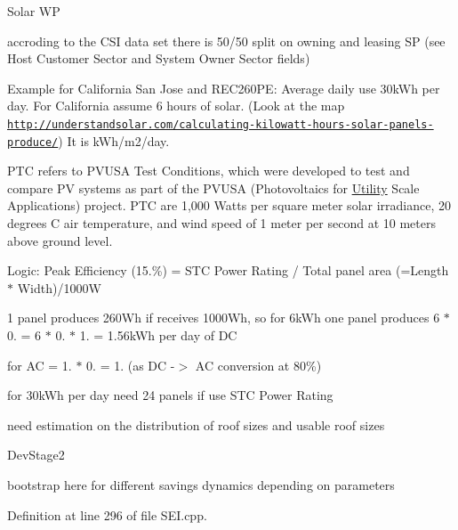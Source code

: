 \begin{DoxyRefDesc}{Solar W\+P}
\item[\hyperlink{wp__wp000003}{Solar W\+P}]accroding to the C\+S\+I data set there is 50/50 split on owning and leasing S\+P (see Host Customer Sector and System Owner Sector fields)\end{DoxyRefDesc}


Example for California San Jose and R\+E\+C260\+P\+E\+: Average daily use 30k\+Wh per day. For California assume 6 hours of solar. (Look at the map \href{http://understandsolar.com/calculating-kilowatt-hours-solar-panels-produce/}{\tt http\+://understandsolar.\+com/calculating-\/kilowatt-\/hours-\/solar-\/panels-\/produce/}) It is k\+Wh/m2/day.

P\+T\+C refers to P\+V\+U\+S\+A Test Conditions, which were developed to test and compare P\+V systems as part of the P\+V\+U\+S\+A (Photovoltaics for \hyperlink{classsolar__core_1_1_utility}{Utility} Scale Applications) project. P\+T\+C are 1,000 Watts per square meter solar irradiance, 20 degrees C air temperature, and wind speed of 1 meter per second at 10 meters above ground level.

Logic\+: Peak Efficiency (15.\%) = S\+T\+C Power Rating / Total panel area (=Length $\ast$ Width)/1000\+W

1 panel produces 260\+Wh if receives 1000\+Wh, so for 6k\+Wh one panel produces 6 $\ast$ 0. = 6 $\ast$ 0. $\ast$ 1. = 1.\+56k\+Wh per day of D\+C

for A\+C = 1. $\ast$ 0. = 1. (as D\+C -\/$>$ A\+C conversion at 80\%)

for 30k\+Wh per day need 24 panels if use S\+T\+C Power Rating

need estimation on the distribution of roof sizes and usable roof sizes \begin{DoxyRefDesc}{Dev\+Stage2}
\item[\hyperlink{_dev_stage2__DevStage2000015}{Dev\+Stage2}]bootstrap here for different savings dynamics depending on parameters \end{DoxyRefDesc}


Definition at line 296 of file S\+E\+I.\+cpp.



